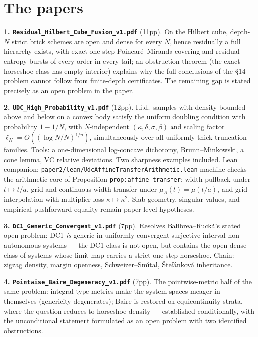 \documentclass[11pt]{article}
\begin{document}
\section*{The papers}

\textbf{1. \texttt{Residual\_Hilbert\_Cube\_Fusion\_v1.pdf}} (11pp).
On the Hilbert cube, depth-$N$ strict brick schemes are open and dense for
every $N$, hence residually a full hierarchy exists, with exact one-step
Poincar\'e--Miranda covering and residual entropy bursts of every order in
every tail; an obstruction theorem (the exact-horseshoe class has empty
interior) explains why the full conclusions of the \S14 problem cannot follow
from finite-depth certificates.  The remaining gap is stated precisely as an
open problem in the paper.

\textbf{2. \texttt{UDC\_High\_Probability\_v1.pdf}} (12pp).
I.i.d.\ samples with density bounded above and below on a convex body satisfy
the uniform doubling condition with probability $1-1/N$, with $N$-independent
$(\kappa,\delta,\sigma,\beta)$ and scaling factor
$\ell_N=O((\log N/N)^{1/n})$, simultaneously over all uniformly thick
truncation families.  Tools: a one-dimensional log-concave dichotomy,
Brunn--Minkowski, a cone lemma, VC relative deviations.  Two sharpness
examples included.
Lean companion: \texttt{paper2/lean/UdcAffineTransferArithmetic.lean}
machine-checks the arithmetic core of Proposition
\texttt{prop:affine-transfer}: width pullback under $t\mapsto t/a$, grid and
continuous-width transfer under $\mu_A(t)=\mu(t/a)$, and grid interpolation
with multiplier loss $\kappa\mapsto\kappa^2$.  Slab geometry, singular values,
and empirical pushforward equality remain paper-level hypotheses.

\textbf{3. \texttt{DC1\_Generic\_Convergent\_v1.pdf}} (7pp).
Resolves Balibrea--Ruck\'a's stated open problem: DC1 \emph{is} generic in
uniformly convergent surjective interval non-autonomous systems --- the DC1
class is not open, but contains the open dense class of systems whose limit
map carries a strict one-step horseshoe.  Chain: zigzag density, margin
openness, Schweizer--Sm\'{\i}tal, \v{S}tef\'ankov\'a inheritance.

\textbf{4. \texttt{Pointwise\_Baire\_Degeneracy\_v1.pdf}} (7pp).
The pointwise-metric half of the same problem: integral-type metrics make the
system spaces meager in themselves (genericity degenerates); Baire is restored
on equicontinuity strata, where the question reduces to horseshoe density ---
established conditionally, with the unconditional statement formulated as an
open problem with two identified obstructions.
\end{document}
